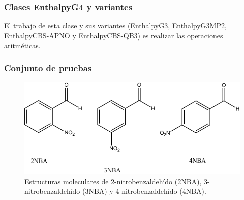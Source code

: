 \documentclass{beamer}
\begin{document}

\begin{frame}
\frametitle{Clases EnthalpyG4 y variantes}
El trabajo de esta clase y sus variantes (EnthalpyG3, EnthalpyG3MP2, EnthalpyCBS-APNO y EnthalpyCBS-QB3) es realizar las operaciones aritméticas.

\end{frame}

\begin{frame}
\frametitle{Conjunto de pruebas}


\begin{figure}[hbtp]
\begin{center}
\includegraphics[width=\textwidth]{images/n-NBA.pdf}
\caption{Estructuras moleculares de 2-nitrobenzaldeh\'{i}do (2NBA), 3-nitrobenzaldeh\'{i}do (3NBA) y 4-nitrobenzaldeh\'{i}do (4NBA).}
\label{n-NBA}
\end{center}
\end{figure}

\end{frame}
\end{document}
